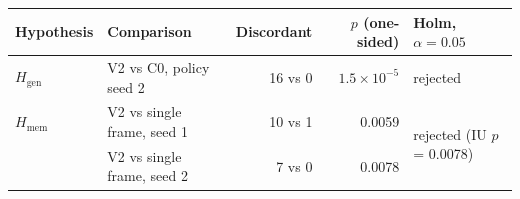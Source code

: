\begin{tabular}{llrrl}
\toprule
Hypothesis & Comparison & Discordant & $p$ (one-sided) & Holm, $\alpha=0.05$\\
\midrule
$H_{\mathrm{gen}}$ & V2 vs C0, policy seed 2 & 16 vs 0 & $1.5\times10^{-5}$ & rejected\\
$H_{\mathrm{mem}}$ & V2 vs single frame, seed 1 & 10 vs 1 & 0.0059 & \multirow{2}{*}{rejected (IU $p$ = 0.0078)}\\
 & V2 vs single frame, seed 2 & 7 vs 0 & 0.0078 & \\
\bottomrule
\end{tabular}
